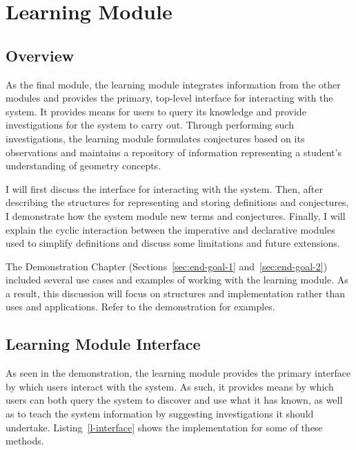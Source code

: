 \chapter{Learning Module}
\label{chap:learning}

\section{Overview}

As the final module, the learning module integrates information from
the other modules and provides the primary, top-level interface for
interacting with the system. It provides means for users to query its
knowledge and provide investigations for the system to carry
out. Through performing such investigations, the learning module
formulates conjectures based on its observations and maintains a
repository of information representing a student's understanding of
geometry concepts.

I will first discuss the interface for interacting with the
system. Then, after describing the structures for representing and
storing definitions and conjectures, I demonstrate how the system
module new terms and conjectures. Finally, I will explain the cyclic
interaction between the imperative and declarative modules used to
simplify definitions and discuss some limitations and future
extensions.

The Demonstration Chapter (Sections~\ref{sec:end-goal-1}
and~\ref{sec:end-goal-2}) included several use cases and examples of
working with the learning module. As a result, this discussion will
focus on structures and implementation rather than uses and
applications. Refer to the demonstration for examples.


\section{Learning Module Interface}

As seen in the demonstration, the learning module provides the primary
interface by which users interact with the system. As such, it
provides means by which users can both query the system to discover
and use what it has known, as well as to teach the system information
by suggesting investigations it should
undertake. Listing~\ref{l-interface} shows the implementation for some
of these methods.

